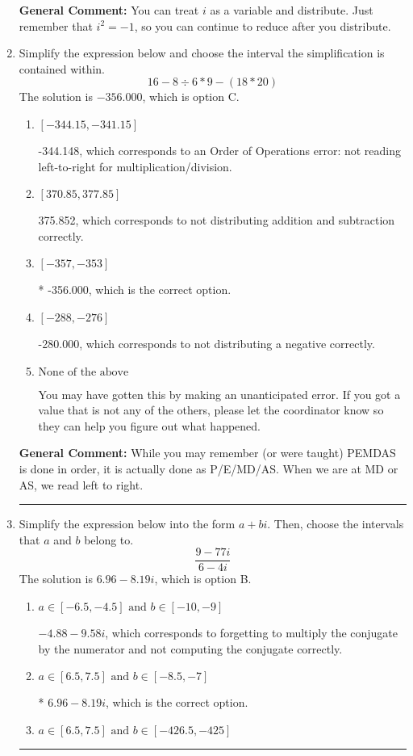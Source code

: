 \documentclass{extbook}[14pt]
\newcommand{\litem}[1]{\item #1

\rule{\textwidth}{0.4pt}}
\begin{document}
\begin{enumerate}
{\textbf{General Comment:} You can treat $i$ as a variable and distribute. Just remember that $i^2=-1$, so you can continue to reduce after you distribute.
}
\litem{
Simplify the expression below and choose the interval the simplification is contained within.
\[ 16 - 8 \div 6 * 9 - (18 * 20) \]The solution is \( -356.000 \), which is option C.\begin{enumerate}[label=\Alph*.]
\item \( [-344.15, -341.15] \)

 -344.148, which corresponds to an Order of Operations error: not reading left-to-right for multiplication/division.
\item \( [370.85, 377.85] \)

 375.852, which corresponds to not distributing addition and subtraction correctly.
\item \( [-357, -353] \)

* -356.000, which is the correct option.
\item \( [-288, -276] \)

 -280.000, which corresponds to not distributing a negative correctly.
\item \( \text{None of the above} \)

 You may have gotten this by making an unanticipated error. If you got a value that is not any of the others, please let the coordinator know so they can help you figure out what happened.
\end{enumerate}

\textbf{General Comment:} While you may remember (or were taught) PEMDAS is done in order, it is actually done as P/E/MD/AS. When we are at MD or AS, we read left to right.
}
\litem{
Simplify the expression below into the form $a+bi$. Then, choose the intervals that $a$ and $b$ belong to.
\[ \frac{9 - 77 i}{6 - 4 i} \]The solution is \( 6.96  - 8.19 i \), which is option B.\begin{enumerate}[label=\Alph*.]
\item \( a \in [-6.5, -4.5] \text{ and } b \in [-10, -9] \)

 $-4.88  - 9.58 i$, which corresponds to forgetting to multiply the conjugate by the numerator and not computing the conjugate correctly.
\item \( a \in [6.5, 7.5] \text{ and } b \in [-8.5, -7] \)

* $6.96  - 8.19 i$, which is the correct option.
\item \( a \in [6.5, 7.5] \text{ and } b \in [-426.5, -425] \)


\end{enumerate}}
\end{enumerate}
\end{document}

